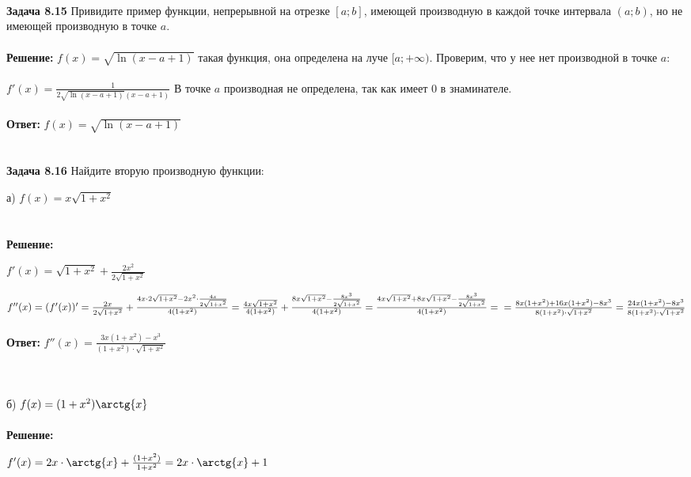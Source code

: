 \documentclass[12pt]{article}
\begin{document}
    \\ \\ \\
    {\large \bf Задача 8.15} Привидите пример функции, непрерывной на отрезке $[a; b]$, имеющей производную в каждой точке интервала $(a; b)$, но не имеющей производную в точке $a$.
    \\
    \\ \textbf{Решение: } $f(x) = \sqrt{\ln{(x - a + 1)}}$ такая функция, она определена на луче $[a; +\infty)$. Проверим, что у нее нет производной в точке $a$:
    \\
    \\ $f'(x) = \frac{1}{2\sqrt{\ln{(x - a + 1)}}(x - a + 1)}$ В точке $a$ производная не определена, так как имеет 0 в знаминателе.
    \\
    \\ \textbf{Ответ: } $f(x) = \sqrt{\ln{(x - a + 1)}}$
    \\ \\ \\
    {\large \bf Задача 8.16} Найдите вторую производную функции:
    \\
    \par а) $f(x) = x\sqrt{1 + x^2}$\\
    \\
    \\ \textbf{Решение: } 
    \par $f'(x) = \sqrt{1 + x^2} + \frac{2x^2}{2\sqrt{1 + x^2}}$
    \par $f''(x) = (f'(x))' = \frac{2x}{2\sqrt{1 + x^2}} + \frac{4x \cdot 2\sqrt{1 + x^2} - 2x^2 \cdot \frac{4x}{2\sqrt{1 + x^2}}}{4(1 + x^2)} = \frac{4x\sqrt{1 + x^2}}{4(1 + x^2)} + \frac{8x\sqrt{1 + x^2} - \frac{8x^3}{2\sqrt{1 + x^2}}}{4(1 + x^2)} = \frac{4x\sqrt{1 + x^2} + 8x\sqrt{1 + x^2} - \frac{8x^3}{2\sqrt{1 + x^2}}}{4(1 + x^2)} =\\ 
    = \frac{8x(1 + x^2) + 16x(1 + x^2) - 8x^3}{8(1 + x^2)\cdot\sqrt{1 + x^2}} = \frac{24x(1 + x^2) - 8x^3}{8(1 + x^2)\cdot\sqrt{1 + x^2}}$
    \\
    \\ \textbf{Ответ: } $f''(x) = \frac{3x(1 + x^2) - x^3}{(1 + x^2)\cdot\sqrt{1 + x^2}}$
    \\ \\ \\
    \par б) $f(x) = (1 + x^2)\arctg{x}$\\
    \\ \textbf{Решение: }
    \par $f'(x) = 2x \cdot \arctg{x} + \frac{(1 + x^2)}{1 + x^2} = 2x \cdot \arctg{x} + 1$
\end{document}
